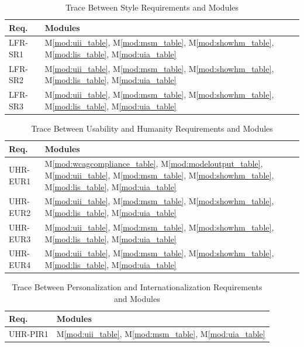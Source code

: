 \documentclass[12pt, titlepage]{article}
\newcommand{\mref}[1]{M\ref{#1}}
\begin{document}
\begin{table}[H]
  \caption{Trace Between Style Requirements and Modules}
  \label{TblSRT}
  \centering
  \small
  \begin{tabularx}{\textwidth}{>{\RaggedRight\arraybackslash}p{}Y}
    \toprule
    \textbf{Req.} & \textbf{Modules}\\
    \midrule
    LFR-SR1 & \mref{mod:uii_table}, \mref{mod:msm_table},
    \mref{mod:showhm_table}, \mref{mod:lis_table}, \mref{mod:uia_table}\\
    LFR-SR2 & \mref{mod:uii_table}, \mref{mod:msm_table},
    \mref{mod:showhm_table}, \mref{mod:lis_table}, \mref{mod:uia_table}\\
    LFR-SR3 & \mref{mod:uii_table}, \mref{mod:msm_table},
    \mref{mod:showhm_table}, \mref{mod:lis_table}, \mref{mod:uia_table}\\
    \bottomrule
  \end{tabularx}
\end{table}

\begin{table}[H]
  \caption{Trace Between Usability and Humanity Requirements and Modules}
  \label{TblURT}
  \centering
  \small
  \begin{tabularx}{\textwidth}{>{\RaggedRight\arraybackslash}p{}Y}
    \toprule
    \textbf{Req.} & \textbf{Modules}\\
    \midrule
    UHR-EUR1 & \mref{mod:wcagcompliance_table},
    \mref{mod:modeloutput_table}, \mref{mod:uii_table},
    \mref{mod:msm_table}, \mref{mod:showhm_table},
    \mref{mod:lis_table}, \mref{mod:uia_table}\\
    UHR-EUR2 & \mref{mod:uii_table}, \mref{mod:msm_table},
    \mref{mod:showhm_table}, \mref{mod:lis_table}, \mref{mod:uia_table}\\
    UHR-EUR3 & \mref{mod:uii_table}, \mref{mod:msm_table},
    \mref{mod:showhm_table}, \mref{mod:lis_table}, \mref{mod:uia_table}\\
    UHR-EUR4 & \mref{mod:uii_table}, \mref{mod:msm_table},
    \mref{mod:showhm_table}, \mref{mod:lis_table}, \mref{mod:uia_table}\\
    \bottomrule
  \end{tabularx}
\end{table}

\begin{table}[H]
  \caption{Trace Between Personalization and Internationalization
  Requirements and Modules}
  \label{TblPIRT}
  \centering
  \small
  \begin{tabularx}{\textwidth}{>{\RaggedRight\arraybackslash}p{}Y}
    \toprule
    \textbf{Req.} & \textbf{Modules}\\
    \midrule
    UHR-PIR1 & \mref{mod:uii_table}, \mref{mod:msm_table},
    \mref{mod:uia_table}\\
    \bottomrule
  \end{tabularx}
\end{table}
\end{document}
